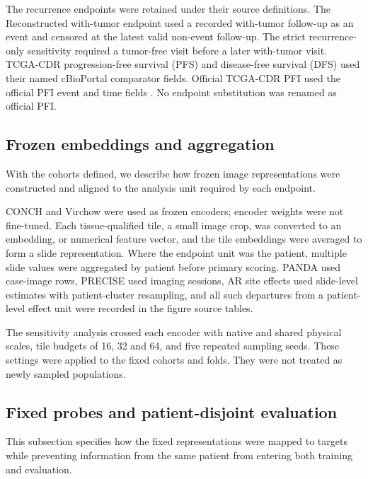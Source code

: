 The recurrence endpoints were retained under their source definitions. The Reconstructed
with-tumor endpoint used a recorded with-tumor follow-up as an event and censored at the
latest valid non-event follow-up. The strict recurrence-only sensitivity required a
tumor-free visit before a later with-tumor visit. TCGA-CDR progression-free survival (PFS)
and disease-free survival (DFS) used their named cBioPortal comparator fields. Official
TCGA-CDR PFI used the official PFI event and time
fields \cite{tcgacdr2018}. No
endpoint substitution was renamed as official PFI.

\subsection{Frozen embeddings and aggregation}

With the cohorts defined, we describe how frozen image representations were constructed and
aligned to the analysis unit required by each endpoint.

CONCH and Virchow were used as frozen encoders; encoder weights were not fine-tuned.
Each tissue-qualified tile, a small image crop, was converted to an embedding, or numerical
feature vector, and the tile embeddings were averaged to form a slide representation. Where the
endpoint unit was the patient, multiple slide values were aggregated by patient before
primary scoring. PANDA used case-image rows, PRECISE used imaging sessions, AR site effects
used slide-level estimates with patient-cluster resampling, and all such departures from a
patient-level effect unit were recorded in the figure source tables.

The sensitivity analysis crossed each encoder with native and shared physical scales, tile
budgets of 16, 32 and 64, and five repeated sampling seeds. These settings were applied to
the fixed cohorts and folds. They were not treated as newly sampled populations.

\subsection{Fixed probes and patient-disjoint evaluation}

This subsection specifies how the fixed representations were mapped to targets while
preventing information from the same patient from entering both training and evaluation.

